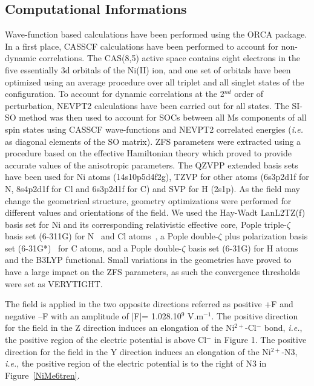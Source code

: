 \documentclass[12pt,a4paper]{report}
\numberwithin{equation}{section}
\begin{document}
\subsection{Computational Informations}
Wave-function based calculations have been performed using the ORCA package.
In a first place, CASSCF calculations have been performed to account for non-dynamic correlations. 
The CAS(8,5) active space contains eight electrons in the five essentially 3d orbitals of the Ni(II) ion, and one set of orbitals have been optimized using an average procedure over all triplet and all singlet states of the configuration.
To account for dynamic correlations at the 2$^{nd}$ order of perturbation, NEVPT2 calculations have been carried out for all states. 
The SI-SO method was then used to account for SOCs between all Ms components of all spin states using CASSCF wave-functions and NEVPT2 correlated energies (\textit{i.e.} as diagonal elements of the SO matrix). 
ZFS parameters were extracted using a procedure based on the effective Hamiltonian theory which proved to provide accurate values of the anisotropic parameters. 
The QZVPP extended basis sets~\cite{weigend_balanced_2005} have been used for Ni atoms (14s10p5d4f2g), TZVP for other atoms (6s3p2d1f for N, 8s4p2d1f for Cl and 6s3p2d1f for C) and SVP for H (2s1p). 
As the field may change the geometrical structure, geometry optimizations were performed for different values and orientations of the field. 
We used the Hay-Wadt LanL2TZ(f) basis set for Ni and its corresponding relativistic effective core, Pople triple-$\zeta$ basis set (6-311G) for N~\cite{weigend_balanced_2005} and Cl atoms~\cite{mclean_contracted_1980}, a Pople double-$\zeta$ plus polarization basis set (6-31G*)~\cite{hehre_selfconsistent_1972} for C atoms, and a Pople double-$\zeta$ basis set (6-31G) for H atoms~\cite{hehre_selfconsistent_1972} and the B3LYP functional\cite{becke_densityfunctional_1993}.
Small variations in the geometries have proved to have a large impact on the ZFS parameters, as such the convergence thresholds were set as VERYTIGHT.

The field is applied in the two opposite directions referred as positive +F and negative –F with an amplitude of |F|= 1.028.10$^9$ V.m$^{-1}$.
The positive direction for the field in the Z direction induces an elongation of the Ni$^{2+}$-Cl$^-$ bond, \textit{i.e.}, the positive region of the electric potential is above Cl$^-$ in Figure 1. 
The positive direction for the field in the Y direction induces an elongation of the Ni$^{2+}$-N3, \textit{i.e.}, the positive region of the electric potential is to the right of N3 in Figure~\ref{NiMe6tren}.
\end{document}
